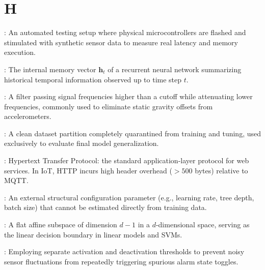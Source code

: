 \section*{H}
\begin{description}[leftmargin=!,labelwidth=4.5cm,itemsep=1.5ex]
\item[\textbf{Hardware-in-the-Loop (HIL)}\hfill \textnormal{\sffamily\scriptsize\color{keyideablue}[TinyML \& Testing]}]: An automated testing setup where physical microcontrollers are flashed and stimulated with synthetic sensor data to measure real latency and memory execution.
\item[\textbf{Hidden State}\hfill \textnormal{\sffamily\scriptsize\color{keyideablue}[Deep Learning]}]: The internal memory vector $\mathbf{h}_t$ of a recurrent neural network summarizing historical temporal information observed up to time step $t$.
\item[\textbf{High-Pass Filter}\hfill \textnormal{\sffamily\scriptsize\color{keyideablue}[Signal Processing]}]: A filter passing signal frequencies higher than a cutoff while attenuating lower frequencies, commonly used to eliminate static gravity offsets from accelerometers.
\item[\textbf{Holdout Set}\hfill \textnormal{\sffamily\scriptsize\color{keyideablue}[Evaluation]}]: A clean dataset partition completely quarantined from training and tuning, used exclusively to evaluate final model generalization.
\item[\textbf{HTTP}\hfill \textnormal{\sffamily\scriptsize\color{keyideablue}[IoT \& Networking]}]: Hypertext Transfer Protocol: the standard application-layer protocol for web services. In IoT, HTTP incurs high header overhead ($> 500$ bytes) relative to MQTT.
\item[\textbf{Hyperparameter}\hfill \textnormal{\sffamily\scriptsize\color{keyideablue}[Machine Learning]}]: An external structural configuration parameter (e.g., learning rate, tree depth, batch size) that cannot be estimated directly from training data.
\item[\textbf{Hyperplane}\hfill \textnormal{\sffamily\scriptsize\color{keyideablue}[Mathematics]}]: A flat affine subspace of dimension $d - 1$ in a $d$-dimensional space, serving as the linear decision boundary in linear models and SVMs.
\item[\textbf{Hysteresis}\hfill \textnormal{\sffamily\scriptsize\color{keyideablue}[TinyML]}]: Employing separate activation and deactivation thresholds to prevent noisy sensor fluctuations from repeatedly triggering spurious alarm state toggles.
\end{description}

